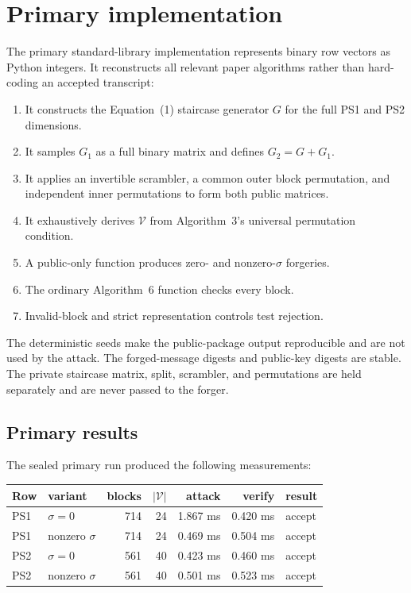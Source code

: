 \documentclass[10pt,a4paper]{article}
\newcommand{\VES}{\mathcal{V}}
\begin{document}
\section{Primary implementation}

The primary standard-library implementation represents binary row vectors as
Python integers.  It reconstructs all relevant paper algorithms rather than
hard-coding an accepted transcript:
\begin{enumerate}
  \item It constructs the Equation~(1) staircase generator $G$ for the full
  PS1 and PS2 dimensions.
  \item It samples $G_1$ as a full binary matrix and defines $G_2=G+G_1$.
  \item It applies an invertible scrambler, a common outer block permutation,
  and independent inner permutations to form both public matrices.
  \item It exhaustively derives $\VES$ from Algorithm~3's universal
  permutation condition.
  \item A public-only function produces zero- and nonzero-$\sigma$ forgeries.
  \item The ordinary Algorithm~6 function checks every block.
  \item Invalid-block and strict representation controls test rejection.
\end{enumerate}

The deterministic seeds make the public-package output reproducible and are
not used by the attack.  The forged-message digests and public-key digests are
stable.  The private staircase matrix, split, scrambler, and permutations are
held separately and are never passed to the forger.

\subsection{Primary results}

The sealed primary run produced the following measurements:
\begin{center}
\small
\begin{tabular}{llrrrrl}
\toprule
Row & variant & blocks & $|\VES|$ & attack & verify & result \\
\midrule
PS1 & $\sigma=0$ & 714 & 24 & 1.867 ms & 0.420 ms & accept \\
PS1 & nonzero $\sigma$ & 714 & 24 & 0.469 ms & 0.504 ms & accept \\
PS2 & $\sigma=0$ & 561 & 40 & 0.423 ms & 0.460 ms & accept \\
PS2 & nonzero $\sigma$ & 561 & 40 & 0.501 ms & 0.523 ms & accept \\
\bottomrule
\end{tabular}
\end{center}
\end{document}
